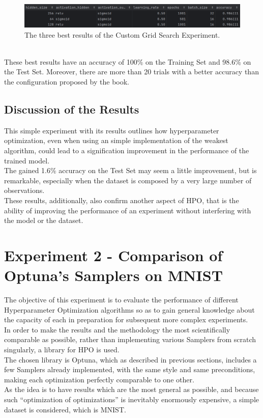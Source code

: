 \begin{figure}[b]
	\centering
	\includegraphics[width=15cm]{figures/figure-4.1.2.png}
	\caption[Best Results of Custom Grid Search Experiment]{The three best results of the Custom Grid Search Experiment.}
	\label{fig:figure-4.1.2}
\end{figure}
\\[0.3cm]These best results have an accuracy of 100\% on the Training Set and 98.6\% on the Test Set. Moreover, there are more than 20 trials with a better accuracy than the configuration proposed by the book.

\subsection{Discussion of the Results}

This simple experiment with its results outlines how hyperparameter optimization, even when using an simple implementation of the weakest algorithm, could lead to a signification improvement in the performance of the trained model.
\\[0.3cm]The gained 1.6\% accuracy on the Test Set may seem a little improvement, but is remarkable, especially when the dataset is composed by a very large number of observations.
\\[0.3cm]These results, additionally, also confirm another aspect of HPO, that is the ability of improving the performance of an experiment without interfering with the model or the dataset.

\section{Experiment 2 - Comparison of Optuna's Samplers on MNIST}\label{sec:Experiment2-4.2}

The objective of this experiment is to evaluate the performance of different Hyperparameter Optimization algorithms so as to gain general knowledge about the capacity of each in preparation for subsequent more complex experiments.
\\[0.3cm]In order to make the results and the methodology the most scientifically comparable as possible, rather than implementing various Samplers from scratch singularly, a library for HPO is used.
\\[0.3cm]The chosen library is Optuna, which as described in previous sections, includes a few Samplers already implemented, with the same style and same preconditions, making each optimization perfectly comparable to one other.
\\[0.3cm]As the idea is to have results which are the most general as possible, and because such “optimization of optimizations” is inevitably enormously expensive, a simple dataset is considered, which is MNIST.

